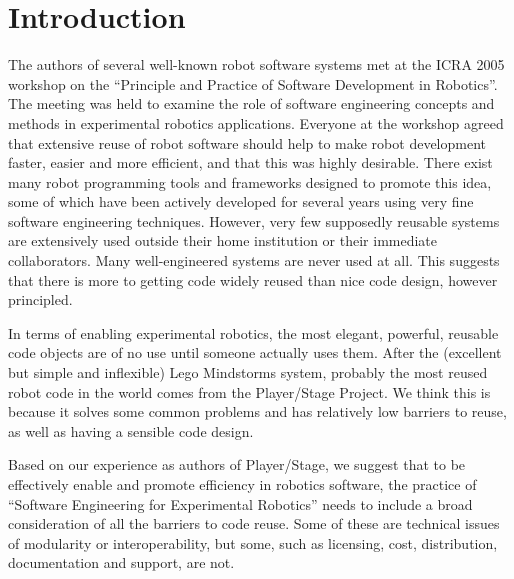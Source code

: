 

\addtocounter{footnote}{-2}

\section{Introduction}
\label{sec:ch32-Intro}

The authors of several well-known robot software systems met at the
ICRA 2005 workshop on the ``Principle and Practice of Software
Development in Robotics''. The meeting was held to examine the role of
software engineering concepts and methods in experimental robotics
applications. Everyone at the workshop agreed that extensive reuse of
robot software should help to make robot development faster, easier
and more efficient, and that this was highly desirable. There exist
many robot programming tools and frameworks designed to promote this
idea, some of which have been actively developed for several years
using very fine software engineering techniques. However, very few
supposedly reusable systems are extensively used outside their home
institution or their immediate collaborators. Many well-engineered
systems are never used at all.  This suggests that there is more to
getting code widely reused than nice code design, however principled.

In terms of enabling experimental robotics, the most elegant,
powerful, reusable code objects are of no use until someone actually
uses them. After the (excellent but simple and inflexible) Lego
Mindstorms system, probably the most reused robot code in the world
comes from the Player/Stage Project.  We think this is because it
solves some common problems and has relatively low barriers to reuse,
as well as having a sensible code design.

Based on our experience as authors of Player/Stage, we suggest that to
be effectively enable and promote efficiency in robotics software, the
practice of ``Software Engineering for Experimental Robotics'' needs
to include a broad consideration of all the barriers to code
reuse. Some of these are technical issues of modularity or
interoperability, but some, such as licensing, cost, distribution,
documentation and support, are not.

